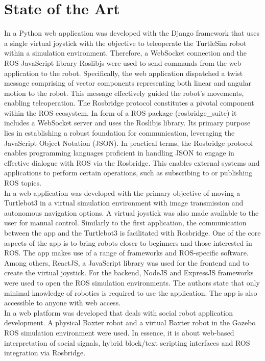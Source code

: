 \documentclass[conference]{IEEEtran}
\begin{document}
\section{State of the Art}
In \cite{kapic} a Python web application was developed with the Django framework that uses a single virtual joystick with the objective to teleoperate the TurtleSim robot within a simulation environment. 
Therefore, a WebSocket connection and the ROS JavaScript library Roslibjs were used to send commands from the web application to the robot. Specifically, the web application dispatched a twist message comprising of vector components representing both linear and angular motion to the robot. This message effectively guided the robot's movements, enabling teleoperation.
The Rosbridge protocol constitutes a pivotal component within the ROS ecosystem. In form of a ROS package (rosbridge\_suite) it includes a WebSocket server and uses the Roslibjs library. Its primary purpose lies in establishing a robust foundation for communication, leveraging the JavaScript Object Notation (JSON).
In practical terms, the Rosbridge protocol enables programming languages proficient in handling JSON to engage in effective dialogue with ROS via the Rosbridge. 
This enables external systems and applications to perform certain operations, such as subscribing to or publishing ROS topics. \cite{rosbridgeOkState} \cite{rosbridgeSuite}\\
In \cite{dinodi} a web application was developed with the primary objective of moving a Turtlebot3 in a virtual simulation environment with image transmission and autonomous navigation options. A virtual joystick was also made available to the user for manual control. Similarly to the first application, the communication between the app and the Turtlebot3 is facilitated with Rosbridge. 
One of the core aspects of the app is to bring robots closer to beginners and those interested in ROS. 
The app makes use of a range of frameworks and ROS-specific software. Among others, ReactJS, a JavaScript library was used for the frontend and to create the virtual joystick. For the backend, NodeJS and ExpressJS frameworks were used to open the ROS simulation environments. 
The authors state that only minimal knowledge of robotics is required to use the application. The app is also accessible to anyone with web access.\\
In \cite{johnson} a web platform was developed that deals with social robot application development. A physical Baxter robot and a virtual Baxter robot in the Gazebo ROS simulation environment were used. In essence, it is about web-based interpretation of social signals, hybrid block/text scripting interfaces and ROS integration via Rosbridge. 
\end{document}
